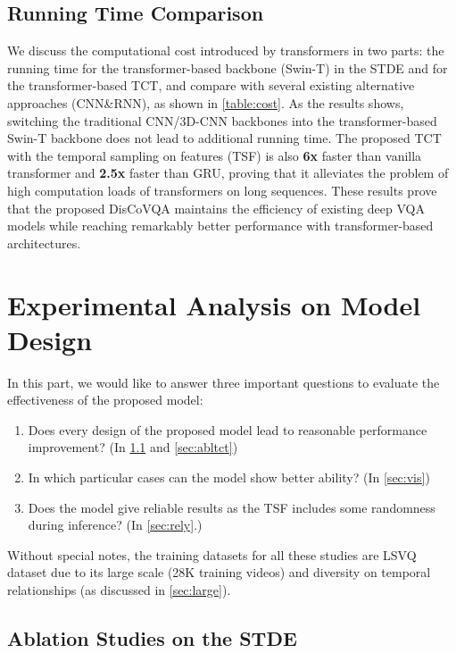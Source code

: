 \documentclass[journal]{IEEEtran}
\begin{document}
\subsection{Running Time Comparison}
\label{sec:time}
We discuss the computational cost introduced by transformers in two parts: the running time for the transformer-based backbone (Swin-T) in the STDE and for the transformer-based TCT, and compare with several existing alternative approaches (CNN\&RNN), as shown in \cref{table:cost}. As the results shows, switching the traditional CNN/3D-CNN backbones into the transformer-based Swin-T backbone does not lead to additional running time. The proposed TCT with the temporal sampling on features (TSF) is also \textbf{6x} faster than vanilla transformer and \textbf{2.5x} faster than GRU, proving that it alleviates the problem of high computation loads of transformers on long sequences. These results prove that the proposed DisCoVQA maintains the efficiency of existing deep VQA models while reaching remarkably better performance with transformer-based architectures.






\section{Experimental Analysis on Model Design}
\label{sec:4}

In this part, we would like to answer three important questions to evaluate the effectiveness of the proposed model:

\begin{enumerate}
    \item Does every design of the proposed model lead to reasonable performance improvement? (In \cref{sec:ablstde} and \cref{sec:abltct})
    \item In which particular cases can the model show better ability? (In \cref{sec:vis})
    \item Does the model give reliable results as the TSF includes some randomness during inference? (In \cref{sec:rely}.)
\end{enumerate}

Without special notes, the training datasets for all these studies are LSVQ dataset due to its large scale (28K training videos) and diversity on temporal relationships (as discussed in \cref{sec:large}).



\subsection{Ablation Studies on the STDE} \label{sec:ablstde}
\end{document}
